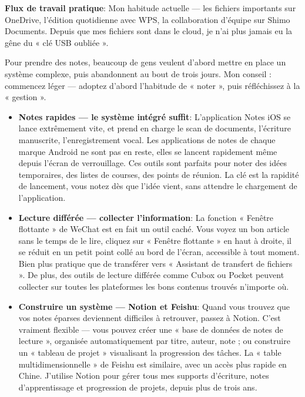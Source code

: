 \textbf{Flux de travail pratique}: Mon habitude actuelle — les fichiers importants sur OneDrive, l'édition quotidienne avec WPS, la collaboration d'équipe sur Shimo Documents. Depuis que mes fichiers sont dans le cloud, je n'ai plus jamais eu la gêne du « clé USB oubliée ».


Pour prendre des notes, beaucoup de gens veulent d'abord mettre en place un système complexe, puis abandonnent au bout de trois jours. Mon conseil : commencez léger — adoptez d'abord l'habitude de « noter », puis réfléchissez à la « gestion ».

\begin{itemize}
  \item \textbf{Notes rapides — le système intégré suffit}: L'application Notes iOS se lance extrêmement vite, et prend en charge le scan de documents, l'écriture manuscrite, l'enregistrement vocal. Les applications de notes de chaque marque Android ne sont pas en reste, elles se lancent rapidement même depuis l'écran de verrouillage. Ces outils sont parfaits pour noter des idées temporaires, des listes de courses, des points de réunion. La clé est la rapidité de lancement, vous notez dès que l'idée vient, sans attendre le chargement de l'application.
  \item \textbf{Lecture différée — collecter l'information}: La fonction « Fenêtre flottante » de WeChat est en fait un outil caché. Vous voyez un bon article sans le temps de le lire, cliquez sur « Fenêtre flottante » en haut à droite, il se réduit en un petit point collé au bord de l'écran, accessible à tout moment. Bien plus pratique que de transférer vers « Assistant de transfert de fichiers ». De plus, des outils de lecture différée comme Cubox ou Pocket peuvent collecter sur toutes les plateformes les bons contenus trouvés n'importe où.
  \item \textbf{Construire un système — Notion et Feishu}: Quand vous trouvez que vos notes éparses deviennent difficiles à retrouver, passez à Notion. C'est vraiment flexible — vous pouvez créer une « base de données de notes de lecture », organisée automatiquement par titre, auteur, note ; ou construire un « tableau de projet » visualisant la progression des tâches. La « table multidimensionnelle » de Feishu est similaire, avec un accès plus rapide en Chine. J'utilise Notion pour gérer tous mes supports d'écriture, notes d'apprentissage et progression de projets, depuis plus de trois ans.
\end{itemize}

